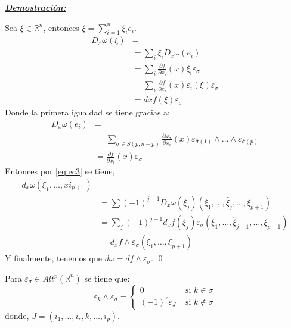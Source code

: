 \underline{\textbf{\textit{Demostración:}}}

\vspace{3mm}
Sea $\xi\in \mathbb{R}^n$, entonces $\xi=\sum_{i=1}^n \xi_ie_i$.
\begin{equation}
  \label{eq:ec3}
  \begin{split}
    D_x\omega(\xi)&= \\
    &=\sum_i \xi_iD_x\omega(e_i)  \\
    &=\sum_i \frac{\partial f}{\partial x_i}(x)\xi_i \varepsilon_\sigma  \\
    &=\sum_i \frac{\partial f}{\partial x_i}(x)\varepsilon_i(\xi)\varepsilon_\sigma \\
    &=dxf(\xi)\varepsilon_\sigma 
  \end{split}
\end{equation}
Donde la primera igualdad se tiene gracias a:
\begin{equation}
  \begin{split}
    D_x\omega(e_i) &= \\
    &=\sum_{\bar{\sigma}\in S(p,n-p)}\frac{\partial \omega_{\bar{\sigma}}}{\partial x_i} (x)\varepsilon_{\bar{\sigma}(1)}\wedge \dots \wedge \varepsilon_{\bar{\sigma}(p)} \\
    &=\frac{\partial f}{\partial x_i}(x)\varepsilon_\sigma
  \end{split}
\end{equation}
Entonces por \ref{eq:ec3} se tiene,
\begin{equation}
  \begin{split}
    d_x\omega(\xi_1,\dots,xi_{p+1})&= \\
    &= \sum(-1)^{j-1}D_x\omega(\xi_j)(\xi_1,\dots,\hat{\xi}_j,\dots,\xi_{p+1}) \\
    &= \sum_j (-1)^{j-1}d_xf(\xi_j)\varepsilon_\sigma (\xi_1,\dots,\hat{\xi}_{j-1},\dots,\xi_{p+1}) \\
    &= d_xf\wedge \varepsilon_\sigma(\xi_1,\dots,\xi_{p+1})
  \end{split}
\end{equation}
Y finalmente, tenemos que $d\omega =df\wedge \varepsilon_\sigma $. \qed


\begin{nota}
Para $\varepsilon_\sigma \in Alt^p(\mathbb{R}^n)$ se tiene que:
$$ \varepsilon_k \wedge \varepsilon_\sigma  = \left \{ \begin{matrix} 0 & \mbox{ si } k\in \sigma
\\ (-1)^r\varepsilon_J & \mbox{ si } k\notin \sigma \end{matrix}\right. $$
donde, $J=(i_1,\dots,i_r,k,\dots,i_p)$. 
\end{nota}


